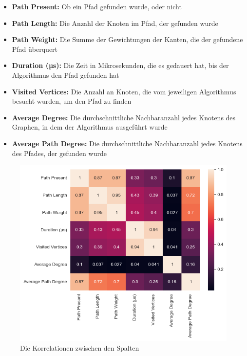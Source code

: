                 \begin{itemize}
                    \item \textbf{Path Present:} Ob ein Pfad gefunden wurde, oder nicht
                    
                    \item \textbf{Path Length:} Die Anzahl der Knoten im Pfad, der gefunden wurde
                    
                    \item \textbf{Path Weight:} Die Summe der Gewichtungen der Kanten, die der gefundene Pfad überquert
                    
                    \item \textbf{Duration (µs):} Die Zeit in Mikrosekunden, die es gedauert hat, bis der Algorithmus den Pfad gefunden hat
                    
                    \item \textbf{Visited Vertices:} Die Anzahl an Knoten, die vom jeweiligen Algorithmus besucht wurden, um den Pfad zu finden
                    
                    \item \textbf{Average Degree:} Die durchschnittliche Nachbaranzahl jedes Knotens des Graphen, in dem der Algorithmus ausgeführt wurde

                    \item \textbf{Average Path Degree:} Die durchschnittliche Nachbaranzahl jedes Knotens des Pfades, der gefunden wurde
                \end{itemize}

                \begin{figure}
                    \centering
                    \includegraphics[width=0.75\linewidth]{images/plots/modifiable/1000/1000/1000/spf/shortest/corr.png}
                    \caption{Die Korrelationen zwischen den Spalten}
                    \label{fig:corr}
                \end{figure}

